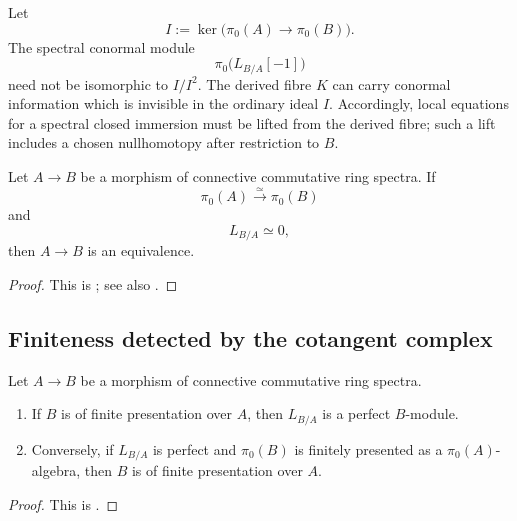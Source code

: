 \begin{remark}
\label{rem:classical-derived-conormal-distinction}
Let
\[
    I
    :=
    \ker
    \bigl(
        \pi_0(A)
        \longrightarrow
        \pi_0(B)
    \bigr).
\]
The spectral conormal module
\[
    \pi_0\bigl(L_{B/A}[-1]\bigr)
\]
need not be isomorphic to $I/I^2$. The derived fibre $K$ can carry
conormal information which is invisible in the ordinary ideal $I$.
Accordingly, local equations for a spectral closed immersion must be
lifted from the derived fibre; such a lift includes a chosen
nullhomotopy after restriction to $B$.
\end{remark}

\begin{corollary}
\label{cor:cotangent-rigidity}
Let $A\to B$ be a morphism of connective commutative ring spectra. If
\[
    \pi_0(A)
    \xrightarrow{\simeq}
    \pi_0(B)
\]
and
\[
    L_{B/A}
    \simeq
    0,
\]
then $A\to B$ is an equivalence.
\end{corollary}

\begin{proof}
This is
\cite[Corollary~7.4.3.4]{LurieHigherAlgebra}; see also
\cite[Corollary~2.7]{LurieDAGIV}.
\end{proof}

\subsection{Finiteness detected by the cotangent complex}

\begin{theorem}
\label{thm:cotangent-finite-presentation}
Let $A\to B$ be a morphism of connective commutative ring spectra.
\begin{enumerate}[label=(\roman*)]
    \item If $B$ is of finite presentation over $A$, then $L_{B/A}$ is a
    perfect $B$-module.

    \item Conversely, if $L_{B/A}$ is perfect and $\pi_0(B)$ is finitely
    presented as a $\pi_0(A)$-algebra, then $B$ is of finite presentation
    over $A$.
\end{enumerate}
\end{theorem}

\begin{proof}
This is
\cite[Theorem~7.4.3.18]{LurieHigherAlgebra}.
\end{proof}

